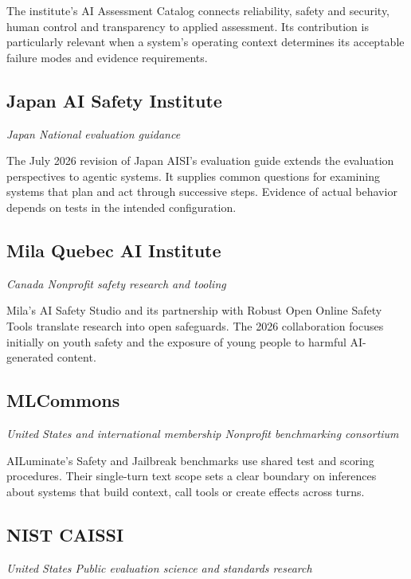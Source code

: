 The institute's AI Assessment Catalog connects reliability, safety and security, human control and transparency to applied assessment. Its contribution is particularly relevant when a system's operating context determines its acceptable failure modes and evidence requirements.~\cite{src67}

\subsection{Japan AI Safety Institute}

\textit{Japan  \textbullet{}  National evaluation guidance}

The July 2026 revision of Japan AISI's evaluation guide extends the evaluation perspectives to agentic systems. It supplies common questions for examining systems that plan and act through successive steps. Evidence of actual behavior depends on tests in the intended configuration.~\cite{src68}

\subsection{Mila Quebec AI Institute}

\textit{Canada  \textbullet{}  Nonprofit safety research and tooling}

\nopagebreak[4]
Mila's AI Safety Studio and its partnership with Robust Open Online Safety Tools translate research into open safeguards. The 2026 collaboration focuses initially on youth safety and the exposure of young people to harmful AI-generated content.~\cite{src69}

\subsection{MLCommons}

\textit{United States and international membership  \textbullet{}  Nonprofit benchmarking consortium}

AILuminate's Safety and Jailbreak benchmarks use shared test and scoring procedures. Their single-turn text scope sets a clear boundary on inferences about systems that build context, call tools or create effects across turns.~\cite{src70}

\subsection{NIST CAISSI}

\textit{United States  \textbullet{}  Public evaluation science and standards research}

